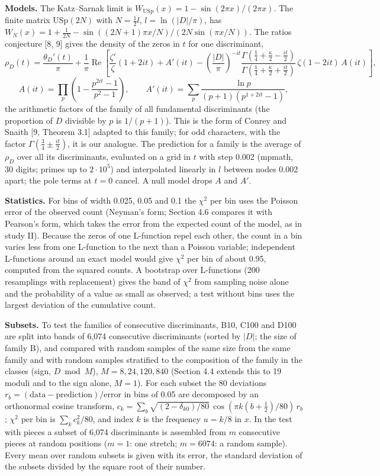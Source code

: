 \documentclass[
  10pt,
]{article}
\begin{document}
\textbf{Models.} The Katz--Sarnak limit is
\(W_{\mathrm{USp}}(x) = 1 - \sin(2\pi x)/(2\pi x)\). The finite matrix
USp\((2N)\) with \(N = \frac12 l\), \(l = \ln(|D|/\pi)\), has
\(W_N(x) = 1 + \frac{1}{2N} - \sin((2N + 1)\pi x/N)/(2N\sin(\pi x/N))\).
The ratios conjecture {[}8, 9{]} gives the density of the zeros in \(t\)
for one discriminant,
\[\rho_D(t) = \frac{\theta_D'(t)}{\pi} + \frac{1}{\pi}\operatorname{Re}\left[\frac{\zeta'}{\zeta}(1 + 2it) + A'(it) - \left(\frac{|D|}{\pi}\right)^{-it}\frac{\Gamma(\frac14 + \frac\kappa2 - \frac{it}{2})}{\Gamma(\frac14 + \frac\kappa2 + \frac{it}{2})}\,\zeta(1 - 2it)\,A(it)\right],\]
\[A(it) = \prod_p\left(1 - \frac{p^{2it} - 1}{p^2 - 1}\right), \qquad A'(it) = \sum_p \frac{\ln p}{(p + 1)(p^{1 + 2it} - 1)},\]
the arithmetic factors of the family of all fundamental discriminants
(the proportion of \(D\) divisible by \(p\) is \(1/(p + 1)\)). This is
the form of Conrey and Snaith {[}9, Theorem 3.1{]} adapted to this
family; for odd characters, with the factor
\(\Gamma(\frac34 \pm \frac{it}{2})\), it is our analogue. The prediction
for a family is the average of \(\rho_D\) over all its discriminants,
evaluated on a grid in \(t\) with step 0.002 (mpmath, 30 digits; primes
up to \(2\cdot10^5\)) and interpolated linearly in \(l\) between nodes
0.002 apart; the pole terms at \(t = 0\) cancel. A null model drops
\(A\) and \(A'\).

\textbf{Statistics.} For bins of width 0.025, 0.05 and 0.1 the
\(\chi^2\) per bin uses the Poisson error of the observed count
(Neyman's form; Section 4.6 compares it with Pearson's form, which takes
the error from the expected count of the model, as in study II). Because
the zeros of one L-function repel each other, the count in a bin varies
less from one L-function to the next than a Poisson variable;
independent L-functions around an exact model would give \(\chi^2\) per
bin of about 0.95, computed from the squared counts. A bootstrap over
L-functions (200 resamplings with replacement) gives the band of
\(\chi^2\) from sampling noise alone and the probability of a value as
small as observed; a test without bins uses the largest deviation of the
cumulative count.

\textbf{Subsets.} To test the families of consecutive discriminants,
B10, C100 and D100 are split into bands of 6,074 consecutive
discriminants (sorted by \(|D|\); the size of family B), and compared
with random samples of the same size from the same family and with
random samples stratified to the composition of the family in the
classes (sign, \(D \bmod M\)), \(M = 8, 24, 120, 840\) (Section 4.4
extends this to 19 moduli and to the sign alone, \(M = 1\)). For each
subset the 80 deviations
\(r_b = (\text{data} - \text{prediction})/\text{error}\) in bins of 0.05
are decomposed by an orthonormal cosine transform,
\(c_k = \sum_b \sqrt{(2 - \delta_{k0})/80}\,\cos(\pi k(b + \frac12)/80)\,r_b\);
\(\chi^2\) per bin is \(\sum_k c_k^2/80\), and index \(k\) is the
frequency \(u = k/8\) in \(x\). In the test with pieces a subset of
6,074 discriminants is assembled from \(m\) consecutive pieces at random
positions (\(m = 1\): one stretch; \(m = 6074\): a random sample). Every
mean over random subsets is given with its error, the standard deviation
of the subsets divided by the square root of their number.
\end{document}
